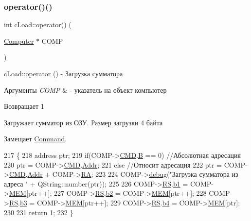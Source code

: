 \subsubsection{\texorpdfstring{operator()()}{operator()()}}
{\footnotesize\ttfamily int c\+Load\+::operator() (\begin{DoxyParamCaption}\item[{\hyperlink{class_computer}{Computer} $\ast$}]{C\+O\+MP }\end{DoxyParamCaption})\hspace{0.3cm}{\ttfamily [virtual]}}



c\+Load\+::operator () -\/ Загрузка сумматора 


\begin{DoxyParams}{Аргументы}
{\em C\+O\+MP} & -\/ указатель на объект компьютер \\
\hline
\end{DoxyParams}
\begin{DoxyReturn}{Возвращает}
1
\end{DoxyReturn}
Загружает сумматор из ОЗУ. Размер загрузки 4 байта 

Замещает \hyperlink{class_command_a79939b66f3de892e91d7710844294716}{Command}.


\begin{DoxyCode}
217 \{
218     address ptr;
219     \textcolor{keywordflow}{if}(COMP->\hyperlink{class_computer_a8423168f7cc356b4dd36977603798caf}{CMD}.\hyperlink{struct_computer_1_1command_a3e0d1e527de9f60594023a362b08a7de}{B} == 0) \textcolor{comment}{//Абсолютная адресация}
220         ptr =  COMP->\hyperlink{class_computer_a8423168f7cc356b4dd36977603798caf}{CMD}.\hyperlink{struct_computer_1_1command_a0e07591012953413797506f7bc3cb1a7}{Addr};
221     \textcolor{keywordflow}{else} \textcolor{comment}{//Относит адресация}
222         ptr = COMP->\hyperlink{class_computer_a8423168f7cc356b4dd36977603798caf}{CMD}.\hyperlink{struct_computer_1_1command_a0e07591012953413797506f7bc3cb1a7}{Addr} + COMP->\hyperlink{class_computer_a499d0b2c857c2977dd5702906705f79e}{RA};
223 
224     COMP->\hyperlink{class_computer_a10ca6c6b200630119201de16d7368e0f}{debug}(\textcolor{stringliteral}{"Загрузка сумматора из адреса "} + QString::number(ptr));
225 
226     COMP->\hyperlink{class_computer_a874503110664b3cf821118d2ce9c2b96}{RS}.\hyperlink{union_computer_1_1data_a4308eb86abfec2d52028212c599a093b}{b1} = COMP->\hyperlink{class_computer_adcd1bd438b7ad95f043db2acbbd864ae}{MEM}[ptr++];
227     COMP->\hyperlink{class_computer_a874503110664b3cf821118d2ce9c2b96}{RS}.\hyperlink{union_computer_1_1data_a87252409c780b1c387883eb027065709}{b2} = COMP->\hyperlink{class_computer_adcd1bd438b7ad95f043db2acbbd864ae}{MEM}[ptr++];
228     COMP->\hyperlink{class_computer_a874503110664b3cf821118d2ce9c2b96}{RS}.\hyperlink{union_computer_1_1data_af9265f845319a83f5877590e7ab2a497}{b3} = COMP->\hyperlink{class_computer_adcd1bd438b7ad95f043db2acbbd864ae}{MEM}[ptr++];
229     COMP->\hyperlink{class_computer_a874503110664b3cf821118d2ce9c2b96}{RS}.\hyperlink{union_computer_1_1data_aca2c60d7da9da79750a6d3a237dae93c}{b4} = COMP->\hyperlink{class_computer_adcd1bd438b7ad95f043db2acbbd864ae}{MEM}[ptr];
230 
231     \textcolor{keywordflow}{return} 1;
232 \}
\end{DoxyCode}


